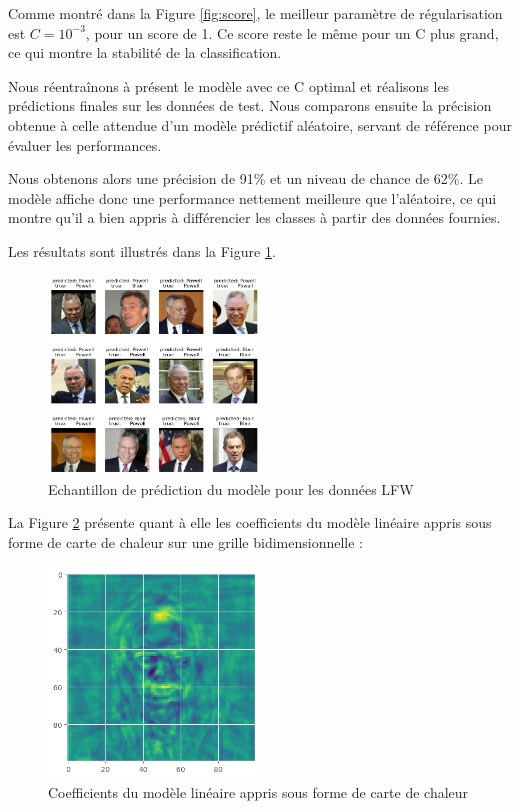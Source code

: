\documentclass{scrartcl}
\begin{document}
Comme montré dans la Figure \ref{fig:score}, le meilleur paramètre de régularisation est $C = 10^{-3}$, pour un score de 1. Ce score reste le même pour un C plus grand, ce qui montre la stabilité de la classification.\newline

Nous réentraînons à présent le modèle avec ce C optimal et réalisons les prédictions finales sur les données de test. Nous comparons ensuite la précision obtenue à celle attendue d'un modèle prédictif aléatoire, servant de référence pour évaluer les performances.\newline

Nous obtenons alors une précision de 91\% et un niveau de chance de 62\%. Le modèle affiche donc une performance nettement meilleure que l'aléatoire, ce qui montre qu'il a bien appris à différencier les classes à partir des données fournies.\newline

Les résultats sont illustrés dans la Figure \ref{fig:prediction}.

\begin{figure}[H]
    \centering
    \includegraphics[width=0.5\textwidth]{../images/TB-CPpred.png}
    \caption{\centering Echantillon de prédiction du modèle pour les données LFW} 
    \label{fig:prediction}
\end{figure}

La Figure \ref{fig:cc} présente quant à elle les coefficients du modèle linéaire appris sous forme de carte de chaleur sur une grille bidimensionnelle :

\begin{figure}[H]
    \centering
    \includegraphics[width=0.5\textwidth]{../images/cc.png}
    \caption{\centering Coefficients du modèle linéaire appris sous forme de carte de chaleur} 
    \label{fig:cc}
\end{figure}
\end{document}
